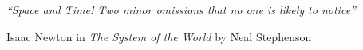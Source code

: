 
\null\vfill %

\textit{``Space and Time! Two minor omissions that no one is likely to notice''}

\begin{flushright}
Isaac Newton in \textit{The System of the World} by Neal Stephenson
\end{flushright}

\vfill\vfill\vfill\vfill\vfill\vfill\null %

